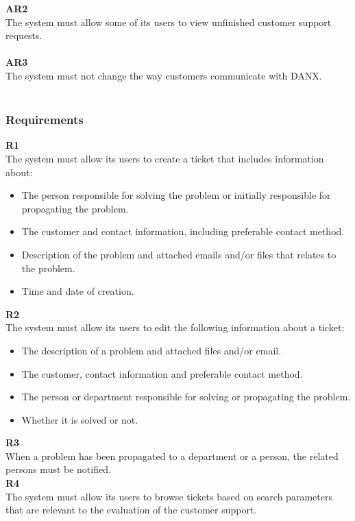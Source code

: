 \textbf{AR2} \\
The system must allow some of its users to view unfinished customer support requests. \\ \\

\textbf{AR3} \\
The system must not change the way customers communicate with DANX. \\ \\
\subsubsection{Requirements}
\textbf{R1} \\
The system must allow its users to create a ticket that includes information about:
\begin{itemize}
\item The person responsible for solving the problem or initially responsible for propagating the problem.
\item The customer and contact information, including preferable contact method.
\item Description of the problem and attached emails and/or files that relates to the problem.
\item Time and date of creation.
\end{itemize}

\textbf{R2} \\
The system must allow its users to edit the following information about a ticket:
\begin{itemize}
\item The description of a problem and attached files and/or email.
\item The customer, contact information and preferable contact method.
\item The person or department responsible for solving or propagating the problem.
\item Whether it is solved or not.
\end{itemize}

\textbf{R3} \\
When a problem has been propagated to a department or a person, the related persons must be notified. \\

\textbf{R4} \\
The system must allow its users to browse tickets based on search parameters that are relevant to the evaluation of the customer support. \\

